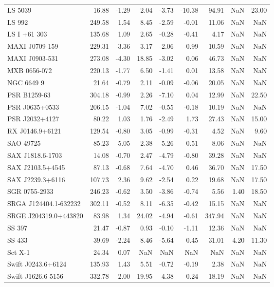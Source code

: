 \documentclass{article}%
\begin{document}
\begin{longtable}{lrrrrrrrr}
LS 5039 & 16.88 & -1.29 & 2.04 & -3.73 & -10.38 & 94.91 & NaN & 23.00 \\
LS 992 & 249.58 & 1.54 & 8.45 & -2.59 & -0.01 & 11.06 & NaN & NaN \\
LS I +61 303 & 135.68 & 1.09 & 2.65 & -0.28 & -0.41 & 4.17 & NaN & NaN \\
MAXI J0709-159 & 229.31 & -3.36 & 3.17 & -2.06 & -0.99 & 10.59 & NaN & NaN \\
MAXI J0903-531 & 273.08 & -4.30 & 18.85 & -3.02 & 0.06 & 46.73 & NaN & NaN \\
MXB 0656-072 & 220.13 & -1.77 & 6.50 & -1.41 & 0.01 & 13.58 & NaN & NaN \\
NGC 6649 9 & 21.64 & -0.79 & 2.11 & -0.09 & -0.06 & 20.05 & NaN & NaN \\
PSR B1259-63 & 304.18 & -0.99 & 2.26 & -7.10 & 0.04 & 12.99 & NaN & 22.50 \\
PSR J0635+0533 & 206.15 & -1.04 & 7.02 & -0.55 & -0.18 & 10.19 & NaN & NaN \\
PSR J2032+4127 & 80.22 & 1.03 & 1.76 & -2.49 & 1.73 & 27.43 & NaN & 15.00 \\
RX J0146.9+6121 & 129.54 & -0.80 & 3.05 & -0.99 & -0.31 & 4.52 & NaN & 9.60 \\
SAO 49725 & 85.23 & 5.05 & 2.38 & -5.26 & -0.51 & 8.06 & NaN & NaN \\
SAX J1818.6-1703 & 14.08 & -0.70 & 2.47 & -4.79 & -0.80 & 39.28 & NaN & NaN \\
SAX J2103.5+4545 & 87.13 & -0.68 & 7.64 & -4.70 & 0.46 & 36.70 & NaN & 17.50 \\
SAX J2239.3+6116 & 107.73 & 2.36 & 9.62 & -2.54 & 0.22 & 19.68 & NaN & 17.50 \\
SGR 0755-2933 & 246.23 & -0.62 & 3.50 & -3.86 & -0.74 & 5.56 & 1.40 & 18.50 \\
SRGA J124404.1-632232 & 302.11 & -0.52 & 8.11 & -6.35 & -0.42 & 15.15 & NaN & NaN \\
SRGE J204319.0+443820 & 83.98 & 1.34 & 24.02 & -4.94 & -0.61 & 347.94 & NaN & NaN \\
SS 397 & 21.47 & -0.87 & 0.93 & -0.10 & -1.11 & 12.36 & NaN & NaN \\
SS 433 & 39.69 & -2.24 & 8.46 & -5.64 & 0.45 & 31.01 & 4.20 & 11.30 \\
Sct X-1 & 24.34 & 0.07 & NaN & NaN & NaN & NaN & NaN & NaN \\
Swift J0243.6+6124 & 135.93 & 1.43 & 5.51 & -0.72 & -0.19 & 2.38 & NaN & NaN \\
Swift J1626.6-5156 & 332.78 & -2.00 & 19.95 & -4.38 & -0.24 & 18.19 & NaN & NaN \\

\end{longtable}
\end{document}
